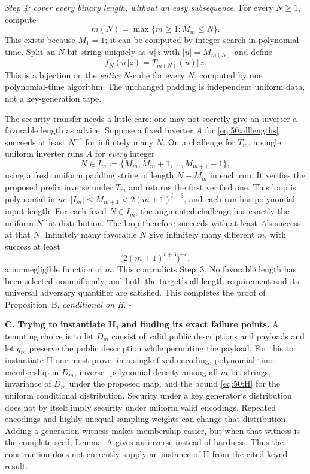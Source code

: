 \documentclass[11pt,a4paper]{article}
\numberwithin{equation}{section}
\begin{document}
\textit{Step 4: cover every binary length, without an easy subsequence.}
For every $N\ge1$, compute
\[
 m(N)=\max\{m\ge1:M_m\le N\}.
\]
This exists because $M_1=1$; it can be computed by integer search in
polynomial time. Split an $N$-bit string uniquely as
$u\Vert z$ with $|u|=M_{m(N)}$ and define
\begin{equation}\label{eq:50:alllengths}
 f_N(u\Vert z)=T_{m(N)}(u)\Vert z.
\end{equation}
This is a bijection on the \emph{entire} $N$-cube for every $N$, computed
by one polynomial-time algorithm. The unchanged padding is independent
uniform data, not a key-generation tape.

The security transfer needs a little care: one may not secretly give
an inverter a favorable length as advice. Suppose a fixed inverter $A$
for \eqref{eq:50:alllengths} succeeds at least $N^{-c}$ for infinitely
many $N$. On a challenge for $T_m$, a single uniform inverter runs $A$
for \emph{every} integer
\[
 N\in I_m:=\{M_m,M_m+1,\ldots,M_{m+1}-1\},
\]
using a fresh uniform padding string of length $N-M_m$ in each run.
It verifies the proposed prefix inverse under $T_m$ and returns the
first verified one. This loop is polynomial in $m$:
$|I_m|\le M_{m+1}<2(m+1)^{t+3}$, and each run has polynomial input length.
For each fixed $N\in I_m$, the augmented challenge has exactly the
uniform $N$-bit distribution. The loop therefore succeeds with at least
$A$'s success at that $N$. Infinitely many favorable $N$ give infinitely
many different $m$, with success at least
\[
 \bigl(2(m+1)^{t+3}\bigr)^{-c},
\]
a nonnegligible function of $m$. This contradicts Step~3. No favorable
length has been selected nonuniformly, and both the target's
all-length requirement and its universal adversary quantifier are
satisfied. This completes the proof of Proposition~B, \emph{conditional
on H}. \hfill$\square$

\medskip{}
\textbf{C. Trying to instantiate H, and finding its exact failure points.}
A tempting choice is to let $D_m$ consist of valid public descriptions
and payloads and let $q_m$ preserve the public description while
permuting the payload. For this to instantiate H one must prove, in a
single fixed encoding, polynomial-time membership in $D_m$, inverse-
polynomial density among all $m$-bit strings, invariance of $D_m$ under
the proposed map, and the bound \eqref{eq:50:H} for the uniform
conditional distribution. Security under a key generator's distribution
does not by itself imply security under uniform valid encodings.
Repeated encodings and highly unequal sampling weights can change that
distribution. Adding a generation witness makes membership easier, but
when that witness is the complete seed, Lemma~A gives an inverse instead
of hardness. Thus the construction does not currently supply an
instance of H from the cited keyed result.
\end{document}
